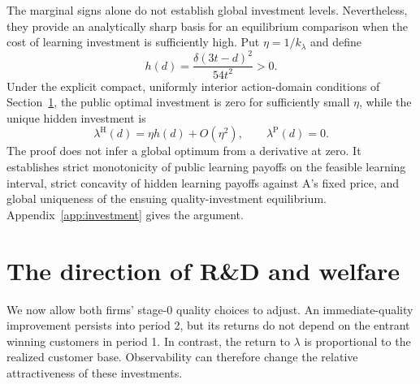 \documentclass[11pt,a4paper]{article}
\numberwithin{equation}{section}
\theoremstyle{remark}
\newcommand{\PP}{\mathrm{P}}
\newcommand{\HH}{\mathrm{H}}
\newcommand{\kl}{k_{\lambda}}
\begin{document}
The marginal signs alone do not establish global investment levels. Nevertheless, they provide an analytically sharp basis for an equilibrium comparison when the cost of learning investment is sufficiently high. Put $\eta=1/\kl$ and define
\begin{equation}
h(d)=\frac{\delta(3t-d)^2}{54t^2}>0. \label{eq:h}
\end{equation}
Under the explicit compact, uniformly interior action-domain conditions of Section~\ref{sec:results}, the public optimal investment is zero for sufficiently small $\eta$, while the unique hidden investment is
\begin{equation}
 \lambda^{\HH}(d)=\eta h(d)+O(\eta^2),\qquad
 \lambda^{\PP}(d)=0. \label{eq:lambdahigh}
\end{equation}
The proof does not infer a global optimum from a derivative at zero. It establishes strict monotonicity of public learning payoffs on the feasible learning interval, strict concavity of hidden learning payoffs against A's fixed price, and global uniqueness of the ensuing quality-investment equilibrium. Appendix~\ref{app:investment} gives the argument.

\section{The direction of R\&D and welfare}\label{sec:results}

We now allow both firms' stage-0 quality choices to adjust. An immediate-quality improvement persists into period 2, but its returns do not depend on the entrant winning customers in period 1. In contrast, the return to $\lambda$ is proportional to the realized customer base. Observability can therefore change the relative attractiveness of these investments.
\end{document}
